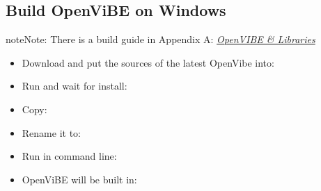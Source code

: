 \documentclass[letterpaper,10pt,english]{sphinxmanual}
\begin{document}
\subsection{Build OpenViBE on Windows}
\label{index:build-openvibe-on-windows}\label{index:build-ov}
\begin{notice}{note}{Note:}
There is a build guide in Appendix A: {\hyperref[index:ov-and-libs-build]{\emph{OpenVIBE \& Libraries}}}
\end{notice}
\begin{itemize}
\item {} 
Download and put the sources of the latest OpenVibe into:
\begin{quote}

\end{quote}

\item {} 
Run and wait for install:
\begin{quote}

\end{quote}

\item {} 
Copy:
\begin{quote}

\end{quote}

\item {} 
Rename it to:
\begin{quote}

\end{quote}

\item {} 
Run in command line:
\begin{quote}


\end{quote}

\item {} 
OpenViBE will be built in:
\begin{quote}

\end{quote}

\end{itemize}
\end{document}
